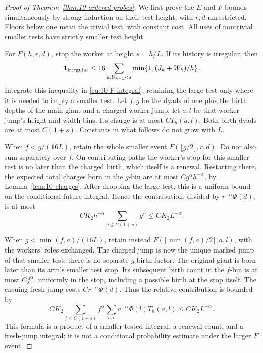 \begin{proof}[Proof of Theorem~\ref{thm:10-ordered-probes}]
We first prove the \(E\) and \(F\) bounds simultaneously by strong
induction on their test height, with \(r,d\) unrestricted. Floors below
one mean the trivial test, with constant cost. All uses of nontrivial
smaller tests have strictly smaller test height.

For \(F(h,r,d)\), stop the worker at height \(s=h/L\). If its history
is irregular, then
\[
 \mathbf1_{\rm irregular}
 \le16\sum_{k:U_{k-1}<s}\min\{1,(J_k+W_k)/h\}.
\]
Integrate this inequality in \eqref{eq:10-F-integral}, retaining the
large test only where it is needed to imply a smaller test. Let \(f,g\)
be the dyads of one plus the birth depths of the main giant and a
charged worker jump; let \(a,l\) be that worker jump's height and width
bins. Its charge is at most \(CT_h(a,l)\). Both birth dyads are at most
\(C(1+s)\). Constants in what follows do not grow with \(L\).

When \(f<g/(16L)\), retain the whole smaller event
\(F(\lfloor g/2\rfloor,r,d)\). Do not also sum separately over \(f\).
On contributing paths the worker's stop for this smaller test is no
later than the charged birth, which itself is a renewal. Restarting
there, the expected total charges born in the \(g\)-bin are at most
\(Cg^\alpha h^{-\alpha}\), by Lemma~\ref{lem:10-charges}. After dropping
the large test, this is a uniform bound on the conditional future
integral. Hence the contribution, divided by
\(r^{-\alpha}\Phi(d)\), is at most
\[
 CK_2h^{-\alpha}\sum_{g\le C(1+s)}g^\alpha
 \le CK_2L^{-\alpha}.
\]

When \(g<\min(f,a)/(16L)\), retain instead
\(F(\lfloor\min(f,a)/2\rfloor,a,l)\), with the workers' roles exchanged.
The charged jump is now the unique marked jump of that smaller test;
there is no separate \(g\)-birth factor. The original giant is born
later than its arm's smaller test stop. Its subsequent birth count in
the \(f\)-bin is at most \(Cf^\alpha\), uniformly in the stop, including
a possible birth at the stop itself. The ensuing fresh jump costs
\(Cr^{-\alpha}\Phi(d)\). Thus the relative contribution is bounded by
\[
 CK_2\sum_{f\le C(1+s)}f^\alpha
      \sum_{a,l}a^{-\alpha}\Phi(l)T_h(a,l)
 \le CK_2L^{-\alpha}.
\]
This formula is a product of a smaller tested integral, a renewal count,
and a fresh-jump integral; it is not a conditional probability estimate
under the larger \(F\) event.


\end{proof}
